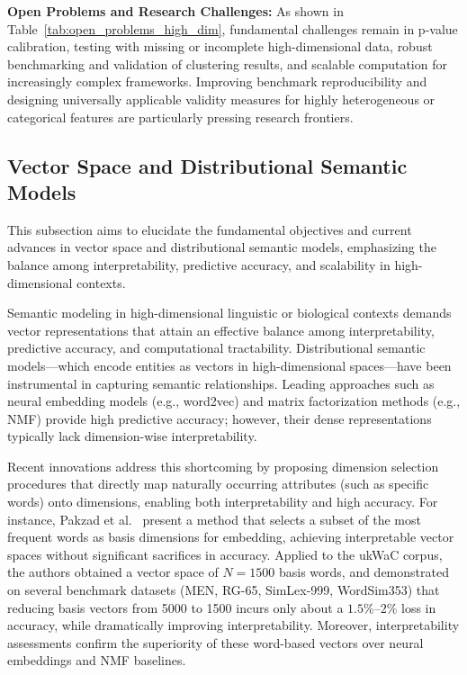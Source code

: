 \documentclass[sigconf]{acmart}
\begin{document}
\noindent
\textbf{Open Problems and Research Challenges:} As shown in Table~\ref{tab:open_problems_high_dim}, fundamental challenges remain in p-value calibration, testing with missing or incomplete high-dimensional data, robust benchmarking and validation of clustering results, and scalable computation for increasingly complex frameworks. Improving benchmark reproducibility and designing universally applicable validity measures for highly heterogeneous or categorical features are particularly pressing research frontiers.

\subsection{Vector Space and Distributional Semantic Models}

This subsection aims to elucidate the fundamental objectives and current advances in vector space and distributional semantic models, emphasizing the balance among interpretability, predictive accuracy, and scalability in high-dimensional contexts.

Semantic modeling in high-dimensional linguistic or biological contexts demands vector representations that attain an effective balance among interpretability, predictive accuracy, and computational tractability. Distributional semantic models—which encode entities as vectors in high-dimensional spaces—have been instrumental in capturing semantic relationships. Leading approaches such as neural embedding models (e.g., word2vec) and matrix factorization methods (e.g., NMF) provide high predictive accuracy; however, their dense representations typically lack dimension-wise interpretability.

Recent innovations address this shortcoming by proposing dimension selection procedures that directly map naturally occurring attributes (such as specific words) onto dimensions, enabling both interpretability and high accuracy. For instance, Pakzad et al.~\cite{ref115} present a method that selects a subset of the most frequent words as basis dimensions for embedding, achieving interpretable vector spaces without significant sacrifices in accuracy. Applied to the ukWaC corpus, the authors obtained a vector space of $N=1500$ basis words, and demonstrated on several benchmark datasets (MEN, RG-65, SimLex-999, WordSim353) that reducing basis vectors from 5000 to 1500 incurs only about a $1.5\%$–$2\%$ loss in accuracy, while dramatically improving interpretability. Moreover, interpretability assessments confirm the superiority of these word-based vectors over neural embeddings and NMF baselines.
\end{document}
